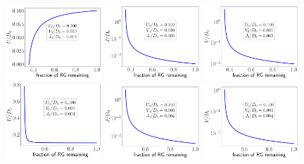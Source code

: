 \documentclass{report}
\numberwithin{equation}{section}
\begin{document}
\begin{figure}[htpb]
	\centering
	\includegraphics[width=0.32\textwidth]{../figures/U_irr,U_gt_0,U.pdf}
	\includegraphics[width=0.32\textwidth]{../figures/U_irr,U_gt_0,J.pdf}
	\includegraphics[width=0.32\textwidth]{../figures/U_irr,U_gt_0,V.pdf}
	\includegraphics[width=0.32\textwidth]{../figures/U_rel,U_gt_0,U.pdf}
	\includegraphics[width=0.32\textwidth]{../figures/U_rel,U_gt_0,J.pdf}
	\includegraphics[width=0.32\textwidth]{../figures/U_rel,U_gt_0,V.pdf}
\end{figure}
\end{document}
